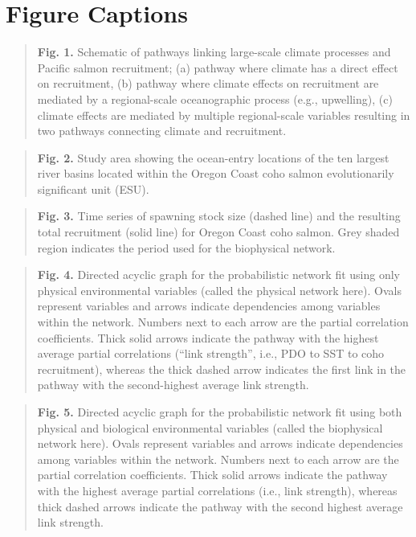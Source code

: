 \newpage

\section{Figure Captions}\label{figure-captions}

\begin{quote}
\textbf{Fig. 1.} Schematic of pathways linking large-scale climate
processes and Pacific salmon recruitment; (a) pathway where climate has
a direct effect on recruitment, (b) pathway where climate effects on
recruitment are mediated by a regional-scale oceanographic process
(e.g., upwelling), (c) climate effects are mediated by multiple
regional-scale variables resulting in two pathways connecting climate
and recruitment.
\end{quote}

\begin{quote}
\textbf{Fig. 2.} Study area showing the ocean-entry locations of the ten
largest river basins located within the Oregon Coast coho salmon
evolutionarily significant unit (ESU).
\end{quote}

\begin{quote}
\textbf{Fig. 3.} Time series of spawning stock size (dashed line) and
the resulting total recruitment (solid line) for Oregon Coast coho
salmon. Grey shaded region indicates the period used for the biophysical
network.
\end{quote}

\begin{quote}
\textbf{Fig. 4.} Directed acyclic graph for the probabilistic network
fit using only physical environmental variables (called the physical
network here). Ovals represent variables and arrows indicate
dependencies among variables within the network. Numbers next to each
arrow are the partial correlation coefficients. Thick solid arrows
indicate the pathway with the highest average partial correlations
(``link strength'', i.e., PDO to SST to coho recruitment), whereas the
thick dashed arrow indicates the first link in the pathway with the
second-highest average link strength.
\end{quote}

\begin{quote}
\textbf{Fig. 5.} Directed acyclic graph for the probabilistic network
fit using both physical and biological environmental variables (called
the biophysical network here). Ovals represent variables and arrows
indicate dependencies among variables within the network. Numbers next
to each arrow are the partial correlation coefficients. Thick solid
arrows indicate the pathway with the highest average partial
correlations (i.e., link strength), whereas thick dashed arrows indicate
the pathway with the second highest average link strength.
\end{quote}


